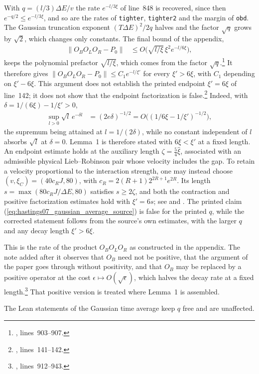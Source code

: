\documentclass{article}
\begin{document}
With $q=(l/3)\Delta E/v$ the rate $e^{-l/3\xi}$ of line~848 is recovered,
since then $e^{-q/2}\le e^{-l/3\xi}$, and so are the rates of \texttt{tighter},
\texttt{tighter2} and the margin of \texttt{obd}. The Gaussian truncation
exponent $(T\Delta E)^2/2q$ halves and the factor $\sqrt q$ grows by $\sqrt2$,
which changes only constants. The final bound of the appendix,
\begin{align}
    \|O_BO_LO_R-P_0\| & \le O\bigl(\sqrt{l/\xi}\,\xi^2e^{-l/6\xi}\bigr),
    \label{eq:hastings07_gaussian_average_final}
\end{align}
keeps the polynomial prefactor $\sqrt{l/\xi}$, which comes from the factor
$\sqrt q$.\footnote{, lines~903--907.}
It therefore gives $\|O_BO_LO_R-P_0\|\le C_1e^{-l/\xi'}$ for every
$\xi'>6\xi$, with $C_1$ depending on $\xi'-6\xi$. This argument does not
establish the printed endpoint $\xi'=6\xi$ of line~142; it does not
show that the endpoint factorization is false.\footnote{,
    lines~141--142.}
Indeed, with $\delta=1/(6\xi)-1/\xi'>0$,
\begin{align}
    \sup_{l>0}\sqrt l\,e^{-\delta l} & =(2e\delta)^{-1/2}
    =O\bigl((1/6\xi-1/\xi')^{-1/2}\bigr),
    \label{eq:hastings07_gaussian_average_prefactor}
\end{align}
the supremum being attained at $l=1/(2\delta)$, while no constant independent of
$l$ absorbs $\sqrt l$ at $\delta=0$. Lemma~1 is therefore stated with
$6\xi<\xi'$ at a fixed length. An endpoint estimate holds at the auxiliary
length $\zeta=\tfrac54\hat\xi$, associated with an admissible physical
Lieb--Robinson pair whose velocity includes the gap. To retain a velocity
proportional to the interaction strength, one may instead choose
$(v,\xi_C)=(40c_RJ,80)$, with
$c_R=2(R+1)2^{2R+1}e^{2R}$. Its length
$s=\max(80c_RJ/\Delta E,80)$ satisfies $s\ge2\zeta$, and both the contraction
and positive factorization estimates hold with $\xi'=6s$; see
 and
.
The printed claim (\ref{eq:hastings07_gaussian_average_source})
is false for the printed $q$, while the corrected statement follows from the
source's own estimates, with the larger $q$ and any decay length $\xi'>6\xi$.

This is the rate of the product $O_BO_LO_R$ as constructed in the appendix.
The note added after it observes that $O_B$ need not be positive, that the
argument of the paper goes through without positivity, and that $O_B$ may be
replaced by a positive operator at the cost $\epsilon\mapsto O(\sqrt\epsilon)$,
which halves the decay rate at a fixed length.\footnote{,
    lines~912--943.}
That positive version is treated where Lemma~1 is assembled.

The Lean statements of the Gaussian time average keep $q$ free and are
unaffected.



\end{document}
